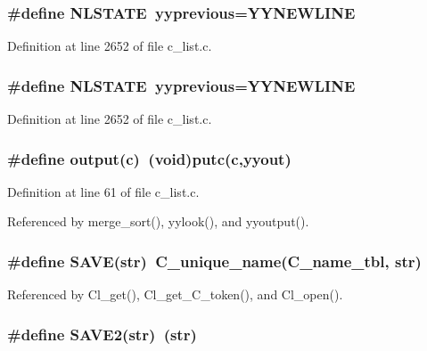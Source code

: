 \subsubsection{\setlength{\rightskip}{0pt plus 5cm}\#define NLSTATE~\bf{yyprevious}=YYNEWLINE}\label{c__list_8c_0a3c2dd7ec2541ed7035842c0e5cb7b1}




Definition at line 2652 of file c\_\-list.c.
\subsubsection{\setlength{\rightskip}{0pt plus 5cm}\#define NLSTATE~\bf{yyprevious}=YYNEWLINE}\label{c__list_8c_0a3c2dd7ec2541ed7035842c0e5cb7b1}




Definition at line 2652 of file c\_\-list.c.
\subsubsection{\setlength{\rightskip}{0pt plus 5cm}\#define output(c)~(void)putc(c,\bf{yyout})}\label{c__list_8c_1a757ed386b9ccb6fb369a7cdbeca52f}




Definition at line 61 of file c\_\-list.c.

Referenced by merge\_\-sort(), yylook(), and yyoutput().
\subsubsection{\setlength{\rightskip}{0pt plus 5cm}\#define SAVE(str)~C\_\-unique\_\-name(\bf{C\_\-name\_\-tbl}, str)}\label{c__list_8c_f216e71da921fad51c0993d94a547dfa}




Referenced by Cl\_\-get(), Cl\_\-get\_\-C\_\-token(), and Cl\_\-open().
\subsubsection{\setlength{\rightskip}{0pt plus 5cm}\#define SAVE2(str)~(str)}\label{c__list_8c_e4d4a59968c56f395147e4d5d84baa2d}





